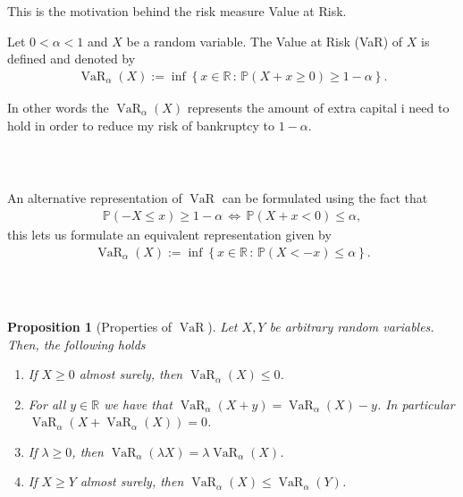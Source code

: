 \documentclass{beamer}
\numberwithin{equation}{section}
\newtheorem{proposition}{Proposition}
\DeclareMathOperator{\VaR}{VaR}
\begin{document}
\begin{frame}\frametitle{{\normalsize \secname} \\ {\large \subsecname}}
    This is the motivation behind the risk measure Value at Risk.
    \begin{definition}
        Let $0 < \alpha < 1$ and $X$ be a random variable.
        The Value at Risk (VaR) of $X$ is defined and denoted by
        \begin{align}
            \VaR_\alpha(X) := \inf
            \left\{
                x \in \mathbb{R} \, : \,
                \mathbb{P}(X + x \geq 0)
                \geq 1 - \alpha
            \right\}.
        \end{align}
    \end{definition}
    In other words the $\VaR_\alpha(X)$ represents the amount of extra capital i need to hold in order to reduce my risk of bankruptcy to $1 - \alpha$.
\end{frame}

\begin{frame}\frametitle{{\normalsize \secname} \\ {\large \subsecname}}
    An alternative representation of $\VaR$ can be formulated using the fact that
    \begin{align}
        \mathbb{P}(-X \leq x) \geq 1 - \alpha
        \, \Longleftrightarrow \,
        \mathbb{P}(X + x < 0) \leq \alpha,
    \end{align}
    this lets us formulate an equivalent representation given by
    \begin{align}
        \VaR_\alpha(X) := \inf
        \left\{
            x \in \mathbb{R} \, : \,
            \mathbb{P}(X < -x) \leq \alpha
        \right\}.
    \end{align}
\end{frame}

\begin{frame}\frametitle{{\normalsize \secname} \\ {\large \subsecname}}
    \begin{proposition}[Properties of $\VaR$]
        Let $X, Y$ be arbitrary random variables.
        Then, the following holds
        \begin{enumerate}
            \item If $X \geq 0$ almost surely, then $\VaR_\alpha(X) \leq 0$.
            \item For all $y\in \mathbb{R}$ we have that $\VaR_\alpha(X + y) = \VaR_\alpha(X) - y$. In particular $\VaR_\alpha(X + \VaR_\alpha(X)) = 0$.
            \item If $\lambda \geq 0$, then $\VaR_\alpha(\lambda X) = \lambda \VaR_\alpha(X)$.
            \item If $X \geq Y$ almost surely, then $\VaR_\alpha(X) \leq \VaR_\alpha(Y)$.
        \end{enumerate}
    \end{proposition}
\end{frame}
\end{document}
